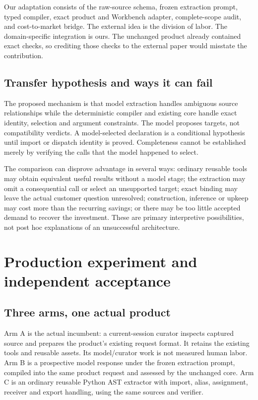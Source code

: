 \documentclass[11pt,a4paper]{article}
\begin{document}
Our adaptation consists of the raw-source schema, frozen extraction prompt, typed compiler, exact product and Workbench adapter, complete-scope audit, and cost-to-market bridge. The external idea is the division of labor. The domain-specific integration is ours. The unchanged product already contained exact checks, so crediting those checks to the external paper would misstate the contribution.

\subsection{Transfer hypothesis and ways it can fail}
The proposed mechanism is that model extraction handles ambiguous source relationships while the deterministic compiler and existing core handle exact identity, selection and argument constraints. The model proposes targets, not compatibility verdicts. A model-selected declaration is a conditional hypothesis until import or dispatch identity is proved. Completeness cannot be established merely by verifying the calls that the model happened to select.

The comparison can disprove advantage in several ways: ordinary reusable tools may obtain equivalent useful results without a model stage; the extraction may omit a consequential call or select an unsupported target; exact binding may leave the actual customer question unresolved; construction, inference or upkeep may cost more than the recurring savings; or there may be too little accepted demand to recover the investment. These are primary interpretive possibilities, not post hoc explanations of an unsuccessful architecture.

\section{Production experiment and independent acceptance}
\subsection{Three arms, one actual product}
Arm A is the actual incumbent: a current-session curator inspects captured source and prepares the product's existing request format. It retains the existing tools and reusable assets. Its model/curator work is not measured human labor. Arm B is a prospective model response under the frozen extraction prompt, compiled into the same product request and assessed by the unchanged core. Arm C is an ordinary reusable Python AST extractor with import, alias, assignment, receiver and export handling, using the same sources and verifier.
\end{document}
